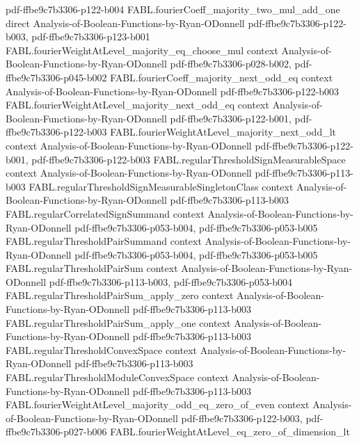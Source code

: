 \begin{theorem}
{    pdf-ffbe9c7b3306-p122-b004}
\proofstep
  {FABL.fourierCoeff_majority_two_mul_add_one}
  {direct}
  {Analysis-of-Boolean-Functions-by-Ryan-ODonnell}
  {pdf-ffbe9c7b3306-p122-b003,
    pdf-ffbe9c7b3306-p123-b001}
\proofstep
  {FABL.fourierWeightAtLevel_majority_eq_choose_mul}
  {context}
  {Analysis-of-Boolean-Functions-by-Ryan-ODonnell}
  {pdf-ffbe9c7b3306-p028-b002,
    pdf-ffbe9c7b3306-p045-b002}
\proofstep
  {FABL.fourierCoeff_majority_next_odd_eq}
  {context}
  {Analysis-of-Boolean-Functions-by-Ryan-ODonnell}
  {pdf-ffbe9c7b3306-p122-b003}
\proofstep
  {FABL.fourierWeightAtLevel_majority_next_odd_eq}
  {context}
  {Analysis-of-Boolean-Functions-by-Ryan-ODonnell}
  {pdf-ffbe9c7b3306-p122-b001,
    pdf-ffbe9c7b3306-p122-b003}
\proofstep
  {FABL.fourierWeightAtLevel_majority_next_odd_lt}
  {context}
  {Analysis-of-Boolean-Functions-by-Ryan-ODonnell}
  {pdf-ffbe9c7b3306-p122-b001,
    pdf-ffbe9c7b3306-p122-b003}
\proofstep
  {FABL.regularThresholdSignMeasurableSpace}
  {context}
  {Analysis-of-Boolean-Functions-by-Ryan-ODonnell}
  {pdf-ffbe9c7b3306-p113-b003}
\proofstep
  {FABL.regularThresholdSignMeasurableSingletonClass}
  {context}
  {Analysis-of-Boolean-Functions-by-Ryan-ODonnell}
  {pdf-ffbe9c7b3306-p113-b003}
\proofstep
  {FABL.regularCorrelatedSignSummand}
  {context}
  {Analysis-of-Boolean-Functions-by-Ryan-ODonnell}
  {pdf-ffbe9c7b3306-p053-b004,
    pdf-ffbe9c7b3306-p053-b005}
\proofstep
  {FABL.regularThresholdPairSummand}
  {context}
  {Analysis-of-Boolean-Functions-by-Ryan-ODonnell}
  {pdf-ffbe9c7b3306-p053-b004,
    pdf-ffbe9c7b3306-p053-b005}
\proofstep
  {FABL.regularThresholdPairSum}
  {context}
  {Analysis-of-Boolean-Functions-by-Ryan-ODonnell}
  {pdf-ffbe9c7b3306-p113-b003,
    pdf-ffbe9c7b3306-p053-b004}
\proofstep
  {FABL.regularThresholdPairSum_apply_zero}
  {context}
  {Analysis-of-Boolean-Functions-by-Ryan-ODonnell}
  {pdf-ffbe9c7b3306-p113-b003}
\proofstep
  {FABL.regularThresholdPairSum_apply_one}
  {context}
  {Analysis-of-Boolean-Functions-by-Ryan-ODonnell}
  {pdf-ffbe9c7b3306-p113-b003}
\proofstep
  {FABL.regularThresholdConvexSpace}
  {context}
  {Analysis-of-Boolean-Functions-by-Ryan-ODonnell}
  {pdf-ffbe9c7b3306-p113-b003}
\proofstep
  {FABL.regularThresholdModuleConvexSpace}
  {context}
  {Analysis-of-Boolean-Functions-by-Ryan-ODonnell}
  {pdf-ffbe9c7b3306-p113-b003}
\proofstep
  {FABL.fourierWeightAtLevel_majority_odd_eq_zero_of_even}
  {context}
  {Analysis-of-Boolean-Functions-by-Ryan-ODonnell}
  {pdf-ffbe9c7b3306-p122-b003,
    pdf-ffbe9c7b3306-p027-b006}
\proofstep
  {FABL.fourierWeightAtLevel_eq_zero_of_dimension_lt}

\end{theorem}
